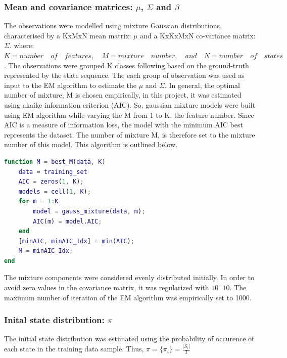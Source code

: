 \subsubsection{Mean and covariance matrices: \(\mu\), \(\Sigma\) and \(\beta\)}

The observations were modelled using mixture Gaussian distributions, characterised by a KxMxN mean matrix: \(\mu\) and a KxKxMxN co-variance matrix: \(\Sigma\).
where: \\ \(K = number \quad of \quad features, \quad M = mixture \quad number, \quad and \quad N = number \quad of \quad states\).
The observations were grouped K classes following based on the ground-truth represented by the state sequence.
The each group of observation was used as input to the EM algorithm to estimate the  \(\mu\) and \(\Sigma\).
In general, the optimal number of mixture, M is chosen empirically, in this project, it was estimated using akaike information criterion (AIC).
So, gaussian mixture models were built using EM algorithm while varying the M from 1 to K, the feature number.
Since AIC is a measure of information loss, the model with the minimum AIC best represents the dataset. The number of mixture M, is therefore set to the mixture number of this model.
This algorithm is outlined below.
\begin{lstlisting}[language=Matlab] 
function M = best_M(data, K)
	data = training_set
	AIC = zeros(1, K);
	models = cell(1, K);
	for m = 1:K
		model = gauss_mixture(data, m);
		AIC(m) = model.AIC;
	end
	[minAIC, minAIC_Idx] = min(AIC);
	M = minAIC_Idx;
end
\end{lstlisting} 

The mixture components were considered evenly distributed initially.
In order to avoid zero values in the covariance matrix, it was regularized with \(10^-10\).
The maximum number of iteration of the EM algorithm was empirically set to 1000.

\subsubsection{Inital state distribution: \(\pi\)}
The initial state distribution was estimated using the probability of occurence of each state in the training data sample.
Thus, \(\pi = \{\pi_i\} = \frac{|S_i|}{T} \)
